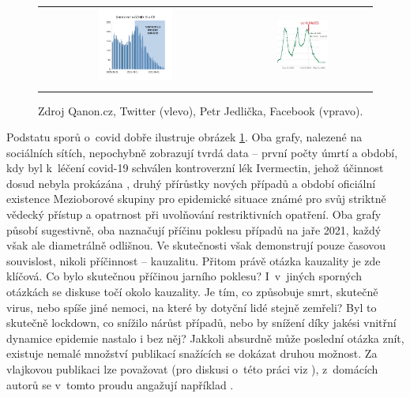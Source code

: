 \begin{figure}
\begin{center}
\begin{tabular}{cc}
\includegraphics[width=0.4\textwidth]{pic/ivernectin.pdf} & \includegraphics[width=0.4\textwidth]{pic/meses.png}\tabularnewline
\tabularnewline
\end{tabular}
\caption{Zdroj Qanon.cz, Twitter (vlevo), Petr Jedlička, Facebook (vpravo).}
\label{fig:iverjedl}
\end{center}
\end{figure}

Podstatu sporů o~covid dobře ilustruje obrázek \ref{fig:iverjedl}. Oba grafy, nalezené na sociálních sítích, nepochybně zobrazují tvrdá data -- první počty úmrtí a období,
kdy byl k~léčení covid-19 schválen kontroverzní
lék Ivermectin, jehož účinnost dosud nebyla prokázána \cite{mzcriver},
druhý přírůstky nových případů a období oficiální existence Mezioborové
skupiny pro epidemické situace \cite{zalozenimeses} známé pro svůj
striktně vědecký přístup a opatrnost při uvolňování restriktivních
opatření. Oba grafy působí sugestivně, oba naznačují příčinu poklesu případů
na jaře 2021, každý však ale diametrálně odlišnou. Ve skutečnosti však demonstrují pouze časovou souvislost, nikoli příčinnost -- kauzalitu. Přitom právě otázka kauzality je zde klíčová. Co bylo skutečnou příčinou jarního poklesu? I~v~jiných sporných otázkách se diskuse točí okolo kauzality. Je tím, co
způsobuje smrt, skutečně virus, nebo spíše jiné nemoci, na které by dotyční lidé stejně zemřeli? Byl to skutečně lockdown, co snížilo nárůst případů,
nebo by snížení díky jakési vnitřní dynamice epidemie nastalo i bez něj? Jakkoli
absurdně může poslední otázka znít, existuje nemalé množství publikací
snažících se dokázat druhou možnost. Za vlajkovou publikaci lze považovat \cite{bendavid2021assessing}
(pro diskusi o~této práci viz \cite{kluveitIoan}), z~domácích autorů
se v~tomto proudu angažují například \cite{hradsky2021demographic}. 

